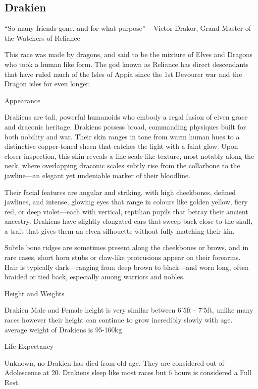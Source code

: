 \begin{multicols}{2}
\subsection{Drakien}

“So many friends gone, and for what purpose” – Victor Drakor, Grand Master of the Watchers of Reliance

This race was made by dragons, and said to be the mixture of Elves and Dragons who took a human like form. The god known as Reliance has direct descendants that have ruled much of the Isles of Appia since the 1st Devourer war and the Dragon isles for even longer.

Appearance

Drakiens are tall, powerful humanoids who embody a regal fusion of elven grace and draconic heritage. Drakiens possess broad, commanding physiques built for both nobility and war. Their skin ranges in tone from warm human hues to a distinctive copper-toned sheen that catches the light with a faint glow. Upon closer inspection, this skin reveals a fine scale-like texture, most notably along the neck, where overlapping draconic scales subtly rise from the collarbone to the jawline—an elegant yet undeniable marker of their bloodline.

Their facial features are angular and striking, with high cheekbones, defined jawlines, and intense, glowing eyes that range in colours like golden yellow, fiery red, or deep violet—each with vertical, reptilian pupils that betray their ancient ancestry. Drakiens have slightly elongated ears that sweep back close to the skull, a trait that gives them an elven silhouette without fully matching their kin. 

Subtle bone ridges are sometimes present along the cheekbones or brows, and in rare cases, short horn stubs or claw-like protrusions appear on their forearms. Hair is typically dark—ranging from deep brown to black—and worn long, often braided or tied back, especially among warriors and nobles.

Height and Weights

Drakien Male and Female height is very similar between 6’5ft - 7’5ft, unlike many races however their height can continue to grow incredibly slowly with age. average weight of Drakiens is 95-160kg

Life Expectancy

Unknown, no Drakien has died from old age. They are considered out of Adolescence at 20. Drakiens sleep like most races but 6 hours is considered a Full Rest.


\end{multicols}
